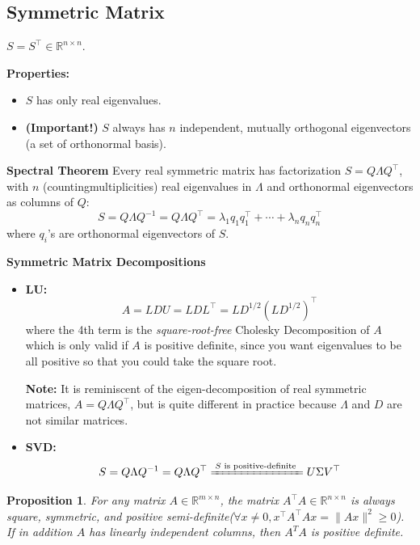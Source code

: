 \documentclass[14pt]{article}
\newtheorem{proposition}[theorem]{Proposition}
\theoremstyle{definition}
\theoremstyle{remark}
\begin{document}
\headrule

\begin{multicols}{2}
    \section{Symmetric Matrix}
    $S = S^\top \in \mathbb{R}^{n\times n}$.

    \textbf{Properties:}
    \begin{itemize}
        \item $S$ has only real eigenvalues.
        \item \textbf{(Important!)} $S$ always has $n$ independent, mutually orthogonal eigenvectors (a set of orthonormal basis).
    \end{itemize}
    \textbf{Spectral Theorem}
    Every real symmetric matrix has factorization $S = Q\Lambda Q^\top$, with $n$ (countingmultiplicities) real eigenvalues in $\Lambda$ and orthonormal eigenvectors as columns of $Q$:
    \[
        S = Q\Lambda Q^{-1} = Q\Lambda Q^\top = \lambda_1 q_1 q_1^\top + \cdots + \lambda_n q_n q_n^\top
    \]
    where $q_i$'s are orthonormal eigenvectors of $S$.

    \textbf{Symmetric Matrix Decompositions}
    \begin{itemize}
        \item \textbf{LU:}
              \[
                  A=LDU=LD L^\top = LD^{1/2}(LD^{1/2})^\top
              \]
              where the 4th term is the \textit{square-root-free} Cholesky Decomposition of $A$ which is only valid if $A$ is positive definite, since you want eigenvalues to be all positive so that you could take the square root.

              \textbf{Note:} It is reminiscent of the eigen-decomposition of real symmetric matrices, $A = Q\Lambda Q^\top$, but is quite different in practice because $\Lambda$ and $D$ are not similar matrices.
        \item \textbf{SVD:}
              \[
                  S = Q\Lambda Q^{-1} = Q\Lambda Q^\top \xlongequal{S \text{ is positive-definite }} U\Sigma V^\top
              \]
    \end{itemize}

    \begin{proposition}
        For any matrix $A\in \mathbb{R}^{m\times n}$, the matrix $A^\top A\in \mathbb{R}^{n\times n}$ is always square, symmetric, and positive semi-definite($\forall x\ne 0, x^\top A^\top Ax = \|Ax\|^2 \ge 0$). If in addition $A$ has linearly independent columns, then $A^{T} A$ is positive definite.


\end{proposition}
\end{multicols}
\end{document}
